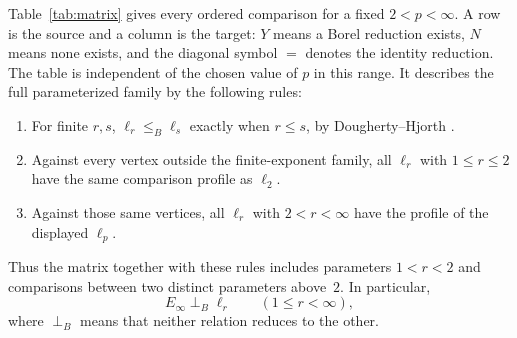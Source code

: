 \documentclass[11pt]{article}
\numberwithin{equation}{section}
\theoremstyle{definition}
\newcommand{\inc}{\mathrel{\perp_B}}
\begin{document}
Table~\ref{tab:matrix} gives every ordered comparison for a fixed
$2<p<\infty$. A row is the source and a column is the target:
$Y$ means a Borel reduction exists, $N$ means none exists, and the
diagonal symbol $=$ denotes the identity reduction. The table is
independent of the chosen value of $p$ in this range.
It describes the full parameterized family by the following rules:
\begin{enumerate}
\item For finite $r,s$, $\ell_r\le_B\ell_s$ exactly when $r\le s$,
by Dougherty--Hjorth \cite{DH}.
\item Against every vertex outside the finite-exponent family, all
$\ell_r$ with $1\le r\le2$ have the same comparison profile as $\ell_2$.
\item Against those same vertices, all $\ell_r$ with $2<r<\infty$
have the profile of the displayed $\ell_p$.
\end{enumerate}
Thus the matrix together with these rules includes parameters
$1<r<2$ and comparisons between two distinct parameters above~$2$.
In particular,
\begin{equation}\label{eq:intro-infty-lp}
 E_\infty\inc\ell_r\qquad(1\le r<\infty),
\end{equation}
where $\inc$ means that neither relation reduces to the other.
\end{document}
